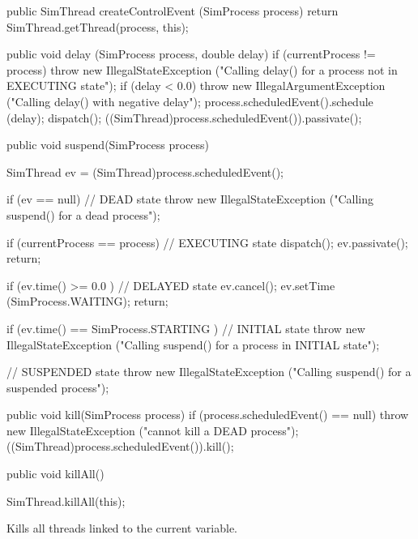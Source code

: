 \begin{code}
\begin{hide}
   public SimThread createControlEvent (SimProcess process) {
      return SimThread.getThread(process, this);
   }

   public void delay (SimProcess process, double delay) {
      if (currentProcess != process)
         throw new IllegalStateException  ("Calling delay() for a process not in EXECUTING state");
      if (delay < 0.0)
         throw new IllegalArgumentException ("Calling delay() with negative delay");
      process.scheduledEvent().schedule (delay);
      dispatch();
      ((SimThread)process.scheduledEvent()).passivate();
   }

   public void suspend(SimProcess process) {
      SimThread ev = (SimThread)process.scheduledEvent();

      if (ev == null)             // DEAD state
         throw new IllegalStateException ("Calling suspend() for a dead process");

      if (currentProcess == process) {             // EXECUTING state
         dispatch();
         ev.passivate();
         return;
      }

      if (ev.time() >= 0.0 ) { // DELAYED state
         ev.cancel();
         ev.setTime (SimProcess.WAITING);
         return;
      }

      if (ev.time() == SimProcess.STARTING ) // INITIAL state
         throw new IllegalStateException
                   ("Calling suspend() for a process in INITIAL state");

                                         // SUSPENDED state
      throw new IllegalStateException ("Calling suspend() for a suspended process");
   }

   public void kill(SimProcess process) {
      if (process.scheduledEvent() == null)
         throw new IllegalStateException ("cannot kill a DEAD process");
      ((SimThread)process.scheduledEvent()).kill();
   }
\end{hide}
   public void killAll() \begin{hide} {
      SimThread.killAll(this);
   } \end{hide}
\end{code}
\begin{tabb}  Kills all threads linked to the current variable.
\end{tabb}
